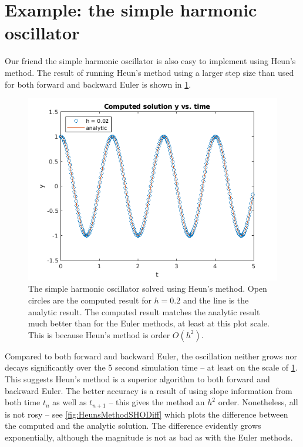 \documentclass[hidelinks,notitlepage]{book}
\begin{document}
\section{Example: the simple harmonic oscillator}
Our friend the simple harmonic oscillator is also easy to implement using Heun's method.  The result of running Heun's method using a larger step size than used for both forward and backward Euler is shown in \cref{fig:HeunsMethodSHO}.  
\begin{figure}[tbh]
	\centering
	\includegraphics[width=0.7\columnwidth]{HeunsMethodSHO.png}
	\caption{The simple harmonic oscillator solved using Heun's method. Open circles are the computed result for $h=0.2$ and the line is the analytic result.  The computed result matches the analytic result much better than for the Euler methods, at least at this plot scale.  This is because Heun's method is order $O(h^2)$.}
	\label{fig:HeunsMethodSHO}
\end{figure}
Compared to both forward and backward Euler, the oscillation neither grows nor decays significantly over the 5 second simulation time -- at least on the scale of \cref{fig:HeunsMethodSHO}.  This suggests Heun's method is a superior algorithm to both forward and backward Euler.  The better accuracy is a result of using slope information from both time $t_n$ as well as $t_{n+1}$ -- this gives the method an $h^2$ order.  Nonetheless, all is not rosy -- see \cref{fig:HeunsMethodSHODiff} which plots the difference between the computed and the analytic solution.  The difference evidently grows exponentially, although the magnitude is not as bad as with the Euler methods.
\end{document}
